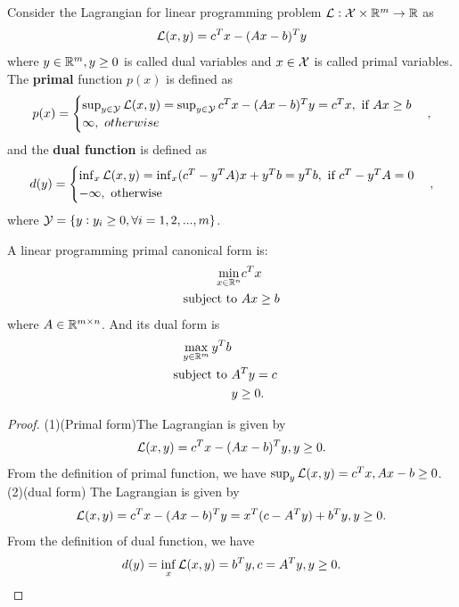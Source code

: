 \begin{refsection}
\begin{definition}
	Consider the Lagrangian for linear programming problem $\mathcal{L}:\mathcal{X}\times \mathbb{R}^m \to \mathbb{R}$ as
	$$\mathcal{L}(x,y) = c^Tx - (Ax-b)^Ty $$
	where $y\in\mathbb{R}^m , y\geq 0$ is called dual variables and $x\in \mathcal{X}$ is called primal variables. 
	The \textbf{primal} function $p(x)$ is defined as
	$$p(x) = \begin{cases}
	\sup_{y\in \mathcal{Y}} \mathcal{L}(x,y) = \sup_{y\in \mathcal{Y}} c^Tx - (Ax-b)^Ty = c^Tx, ~\text{if}~ Ax\geq b\\
	\infty, ~otherwise
	\end{cases},$$
	and the \textbf{dual function} is defined as
	$$d(y) = \begin{cases}
	\inf_{x} \mathcal{L}(x,y) = \inf_{x}(c^T-y^TA)x + y^Tb = y^Tb, ~\text{if}~ c^T-y^TA = 0\\
	-\infty, ~\text{otherwise}~ 
	\end{cases},$$
	where $\mathcal{Y} =\{y:y_i\geq 0, \forall i=1,2,...,m\}$.
\end{definition}

\begin{lemma}\label{ch:linear-optimization:th:dualformCanonicalLinearOptimization}
	A linear programming primal canonical form is:
	\begin{align*}
	\min_{x\in \mathbb{R}^n} &c^Tx\\
	\text{subject to} ~ & Ax\geq b\\
	\end{align*}
	where $A\in \mathbb{R}^{m\times n}$.
	And its dual form is
	\begin{align*}
	\max_{y\in \mathbb{R}^m} y^Tb\\
	\text{subject to} ~ & A^Ty = c\\
	& y \geq 0.
	\end{align*}
\end{lemma}
\begin{proof}
(1)(Primal form)The Lagrangian is given by
$$\mathcal{L}(x,y) = c^Tx - (Ax-b)^Ty, y\geq 0.$$
From the definition of primal function, we have $\sup_{y} \mathcal{L}(x,y) =  c^Tx, Ax - b \geq 0$.
(2)(dual form)  The Lagrangian is given by
$$\mathcal{L}(x,y) = c^Tx - (Ax-b)^Ty = x^T(c - A^Ty) + b^Ty, y\geq 0.$$
From the definition of dual function, we have $$d(y) = \inf_{x} \mathcal{L}(x,y) = b^Ty, c = A^Ty, y\geq 0.$$
\end{proof}



\end{refsection}

